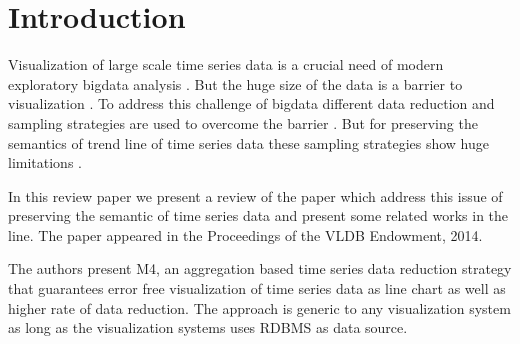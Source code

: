 \section{Introduction} \label{intro}
Visualization of large scale time series data is a crucial need of modern exploratory
bigdata analysis \cite{fu2011review}. But the huge size of the data is a barrier to visualization \cite{labrinidis2012challenges,fan2014challenges,chen2014data}. 
To address this challenge of bigdata different data reduction and sampling strategies are used to overcome the barrier \cite{cormode2014sampling,wu2014data}. But for preserving the 
semantics of trend line of time series data these sampling strategies show huge 
limitations \cite{jugel2014m4}. 

In this review paper we present a review of the paper \cite{jugel2014m4} which address this issue of preserving the semantic of time series data and present some related works in the line.  The paper appeared in the Proceedings of the VLDB Endowment, 2014. 

The authors present M4, an aggregation based time series data reduction strategy that guarantees error free visualization of time series data as line chart as well as higher rate of data reduction. The approach is generic to any visualization system as long as the visualization systems uses RDBMS as data source.  